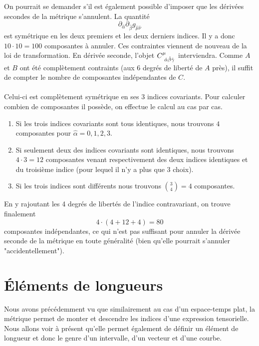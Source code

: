 \begin{rmk}
On pourrait se demander s'il est également possible d'imposer que les dérivées secondes de la métrique s'annulent. La quantité
\begin{equation}
    \partial_{\hat{\alpha}}\partial_{\hat{\beta}}g_{\hat{\mu}\hat{\nu}}
\end{equation}
est symétrique en les deux premiers et les deux derniers indices. Il y a donc $10\cdot 10=100$ composantes à annuler. Ces contraintes viennent de nouveau de la loi de transformation. En dérivée seconde, l'objet $C\indices{^{\mu}_{\!\hat{\alpha}\hat{\beta}\hat{\gamma}}}$ interviendra. Comme $A$ et $B$ ont été complètement contraints (aux 6 degrés de liberté de $A$ près), il suffit de compter le nombre de composantes indépendantes de $C$.\\
\\
Celui-ci est complètement symétrique en ses $3$ indices covariants. Pour calculer combien de composantes il possède, on effectue le calcul au cas par cas. 
\begin{enumerate}
    \item Si les trois indices covariants sont tous identiques, nous trouvons $4$ composantes pour $\hat{\alpha} = 0,1,2,3$.
    \item Si seulement deux des indices covariants sont identiques, nous trouvons $4 \cdot 3 = 12$ composantes venant respectivement des deux indices identiques et du troisième indice (pour lequel il n'y a plus que 3 choix).
    \item Si les trois indices sont différents nous trouvons ${3\choose 4} = 4$ composantes.
\end{enumerate}
En y rajoutant les 4 degrés de libertés de l'indice contravariant, on trouve finalement
\begin{equation}
    4\cdot (4+12+4)=80
\end{equation}
composantes indépendantes, ce qui n'est pas suffisant pour annuler la dérivée seconde de la métrique en toute généralité (bien qu'elle pourrait s'annuler "accidentellement").
\end{rmk}

\section{Éléments de longueurs}
Nous avons précédemment vu que similairement au cas d'un espace-temps plat, la métrique permet de monter et descendre les indices d'une expression tensorielle. Nous allons voir à présent qu'elle permet également de définir un élément de longueur et donc le genre d'un intervalle, d'un vecteur et d'une courbe. 

